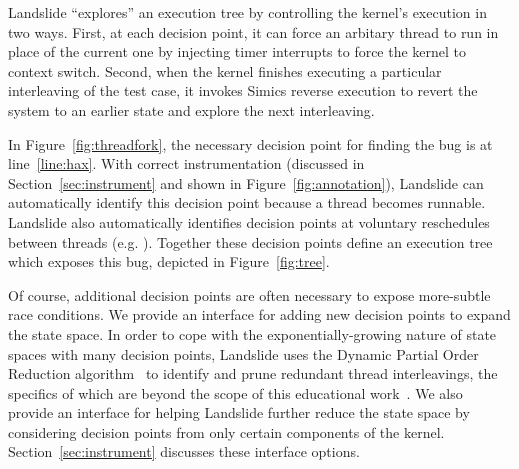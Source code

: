 Landslide ``explores'' an execution tree by controlling the kernel's execution in two ways.
First, at each decision point, it can force an arbitary thread to run in place of the current one by injecting timer interrupts to force the kernel to context switch.
Second, when the kernel finishes executing a particular interleaving of the test case, it invokes Simics reverse execution to revert the system to an earlier state and explore the next interleaving.

In Figure~\ref{fig:threadfork}, the necessary decision point for finding the bug is at line~\ref{line:hax}. With correct instrumentation (discussed in Section~\ref{sec:instrument} and shown in Figure~\ref{fig:annotation}), Landslide can automatically identify this decision point because a thread becomes runnable.
Landslide also automatically identifies decision points at voluntary reschedules between threads (e.g. ). Together these decision points define an execution tree which exposes this bug, depicted in Figure~\ref{fig:tree}.


Of course, additional decision points are often necessary to expose more-subtle race conditions.
We provide an interface for adding new decision points to expand the state space.
In order to cope with the exponentially-growing nature of state spaces with many decision points,
{Landslide uses the Dynamic Partial Order Reduction algorithm~\cite{dpor} to identify and prune redundant thread interleavings, the specifics of which are beyond the scope of this educational work~\cite{landslide}.
We also provide an interface for helping Landslide further reduce the state space by considering}
decision points from only certain components of the kernel.
Section~\ref{sec:instrument} discusses these interface options.

